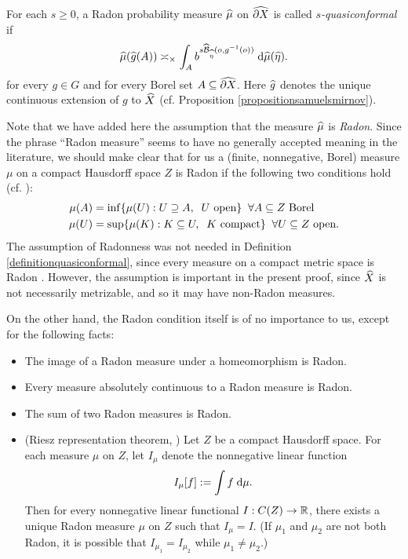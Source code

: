 \begin{definition}
\label{definitionquasiconformalnonstandard}
For each $s\geq 0$, a Radon probability measure $\widehat\mu$ on $\widehat{\partial X}$ is called \emph{$s$-quasiconformal} if
\[
\widehat\mu(\widehat g(A)) \asymp_\times \int_A b^{s\widehat{\operatorname{\mathcal B}}_{\widehat\eta}(o,g^{-1}(o))}\;\mathrm{d}\widehat\mu(\widehat\eta).
\]
for every $g\in G$ and for every Borel set $A\subseteq\widehat{\partial X}$. Here $\widehat g$ denotes the unique continuous extension of $g$ to $\widehat X$ (cf. Proposition \ref{propositionsamuelsmirnov}).
\end{definition}

\begin{remark}
\label{remarkradon}
Note that we have added here the assumption that the measure $\widehat\mu$ is \emph{Radon}. Since the phrase ``Radon measure'' seems to have no generally accepted meaning in the literature, we should make clear that for us a (finite, nonnegative, Borel) measure $\mu$ on a compact Hausdorff space $Z$ is Radon if the following two conditions hold (cf. \cite[]{Folland}):
\begin{align*}
\mu(A) &= \inf\{\mu(U) : U\supseteq A, \;\; U\textup{ open}\} \;\;\forall A\subseteq Z \textup{ Borel}\\
\mu(U) &= \sup\{\mu(K) : K\subseteq U, \;\; K\textup{ compact}\} \;\;\forall U\subseteq Z \textup{ open.}
\end{align*}
The assumption of Radonness was not needed in Definition \ref{definitionquasiconformal}, since every measure on a compact metric space is Radon \cite[Theorem 7.8]{Folland}. However, the assumption is important in the present proof, since $\widehat X$ is not necessarily metrizable, and so it may have non-Radon measures.

On the other hand, the Radon condition itself is of no importance to us, except for the following facts:
\begin{itemize}
\item[(i)] The image of a Radon measure under a homeomorphism is Radon.
\item[(ii)] Every measure absolutely continuous to a Radon measure is Radon.
\item[(iii)] The sum of two Radon measures is Radon.
\item[(iv)] (Riesz representation theorem, \cite[Theorem 7.2]{Folland}) Let $Z$ be a compact Hausdorff space. For each measure $\mu$ on $Z$, let $I_\mu$ denote the nonnegative linear function
\[
I_\mu[f] := \int f\;\mathrm{d}\mu.
\]
Then for every nonnegative linear functional $I:C(Z)\to \R$, there exists a unique Radon measure $\mu$ on $Z$ such that $I_\mu = I$. (If $\mu_1$ and $\mu_2$ are not both Radon, it is possible that $I_{\mu_1} = I_{\mu_2}$ while $\mu_1\neq\mu_2$.)
\end{itemize}
\end{remark}

